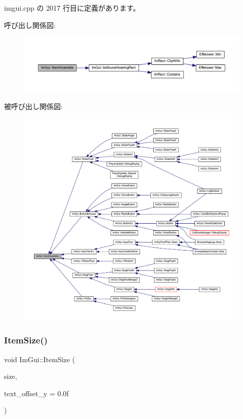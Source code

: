  imgui.\+cpp の 2017 行目に定義があります。

呼び出し関係図\+:\nopagebreak
\begin{figure}[H]
\begin{center}
\leavevmode
\includegraphics[width=350pt]{namespace_im_gui_a488b86a9f235923304186fb86ff64ffb_cgraph}
\end{center}
\end{figure}
被呼び出し関係図\+:\nopagebreak
\begin{figure}[H]
\begin{center}
\leavevmode
\includegraphics[width=350pt]{namespace_im_gui_a488b86a9f235923304186fb86ff64ffb_icgraph}
\end{center}
\end{figure}
\mbox{\label{namespace_im_gui_ac7b9a7399d9606b25278002303f545b6}} 
\subsubsection{\texorpdfstring{Item\+Size()}{ItemSize()}\hspace{0.1cm}{\footnotesize\ttfamily [1/2]}}
{\footnotesize\ttfamily void Im\+Gui\+::\+Item\+Size (\begin{DoxyParamCaption}\item[{const \mbox{\hyperlink{struct_im_vec2}{Im\+Vec2}} \&}]{size,  }\item[{float}]{text\+\_\+offset\+\_\+y = {\ttfamily 0.0f} }\end{DoxyParamCaption})}



